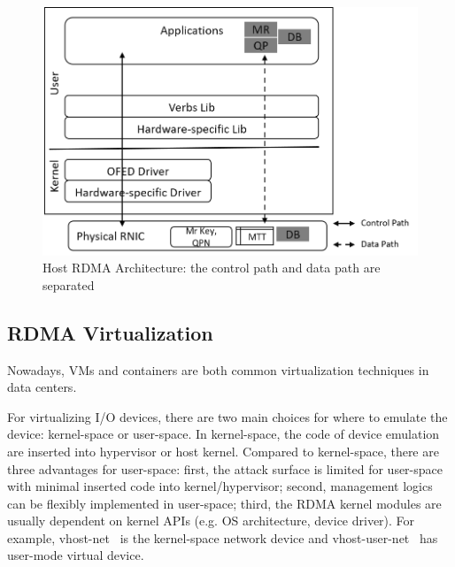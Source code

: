 \begin{figure}[!ht]
	\centering
	\includegraphics[width=0.8\linewidth]{images/rdma-feat.png}
	\caption{Host RDMA Architecture: the control path and data path are separated}
	\label{fig:rdma-feat}
\end{figure}

\subsection{RDMA Virtualization}
Nowadays, VMs and containers are both common virtualization techniques in data centers.

For virtualizing I/O devices, there are two main choices for where to emulate the device: kernel-space or user-space. In kernel-space, the code of device emulation are inserted into hypervisor or host kernel. Compared to kernel-space, there are three advantages for user-space: first, the attack surface is limited for user-space with minimal inserted code into kernel/hypervisor; second, management logics can be flexibly implemented in user-space; third, the RDMA kernel modules are usually dependent on kernel APIs (e.g. OS architecture, device driver). For example, vhost-net~\cite{vhost-net} is the kernel-space network device and vhost-user-net~\cite{vhost-user-net} has user-mode virtual device.
